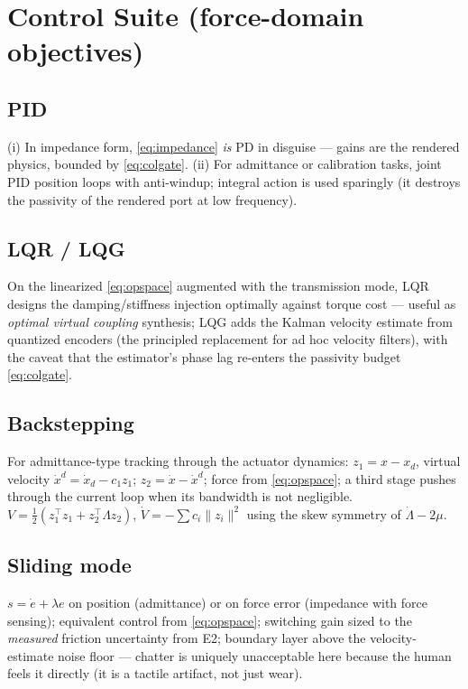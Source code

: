 \documentclass[conference]{IEEEtran}
\begin{document}
\section{Control Suite (force-domain objectives)}
\subsection{PID}
(i) In impedance form, \eqref{eq:impedance} \emph{is} PD in disguise --- gains are the rendered physics, bounded by \eqref{eq:colgate}. (ii) For admittance or calibration tasks, joint PID position loops with anti-windup; integral action is used sparingly (it destroys the passivity of the rendered port at low frequency).

\subsection{LQR / LQG}
On the linearized \eqref{eq:opspace} augmented with the transmission mode, LQR designs the damping/stiffness injection optimally against torque cost --- useful as \emph{optimal virtual coupling} synthesis; LQG adds the Kalman velocity estimate from quantized encoders (the principled replacement for ad hoc velocity filters), with the caveat that the estimator's phase lag re-enters the passivity budget \eqref{eq:colgate}.

\subsection{Backstepping}
For admittance-type tracking through the actuator dynamics: $z_1 = x - x_d$, virtual velocity $\dot x^d = \dot x_d - c_1 z_1$; $z_2 = \dot x - \dot x^d$; force from \eqref{eq:opspace}; a third stage pushes through the current loop when its bandwidth is not negligible. $V = \tfrac12(z_1^{\!\top}z_1 + z_2^{\!\top}\Lambda z_2)$, $\dot V = -\sum c_i\|z_i\|^2$ using the skew symmetry of $\dot\Lambda - 2\mu$.

\subsection{Sliding mode}
$s = \dot e + \lambda e$ on position (admittance) or on force error (impedance with force sensing); equivalent control from \eqref{eq:opspace}; switching gain sized to the \emph{measured} friction uncertainty from E2; boundary layer above the velocity-estimate noise floor --- chatter is uniquely unacceptable here because the human feels it directly (it is a tactile artifact, not just wear).
\end{document}
